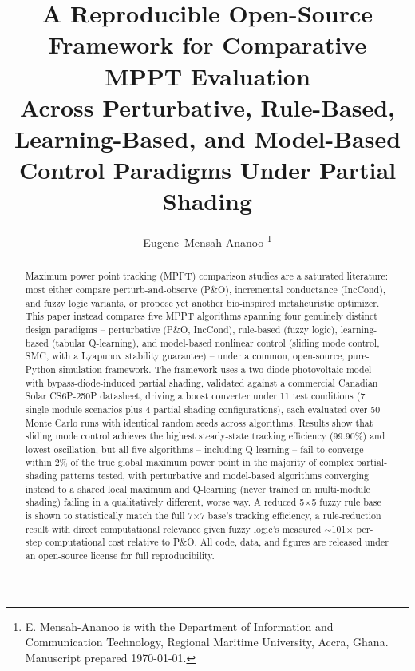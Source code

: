 \documentclass[journal]{IEEEtran}
\begin{document}
\title{A Reproducible Open-Source Framework for Comparative MPPT Evaluation\\
Across Perturbative, Rule-Based, Learning-Based, and Model-Based\\
Control Paradigms Under Partial Shading}


\author{Eugene~Mensah-Ananoo%
  \thanks{E. Mensah-Ananoo is with the Department of Information and
  Communication Technology, Regional Maritime University, Accra, Ghana.
  Manuscript prepared \today.}}


\maketitle

\begin{abstract}
Maximum power point tracking (MPPT) comparison studies are a saturated
literature: most either compare perturb-and-observe (P\&O), incremental
conductance (IncCond), and fuzzy logic variants, or propose yet another
bio-inspired metaheuristic optimizer. This paper instead compares five MPPT
algorithms spanning four genuinely distinct design paradigms --
perturbative (P\&O, IncCond), rule-based (fuzzy logic), learning-based
(tabular Q-learning), and model-based nonlinear control (sliding mode
control, SMC, with a Lyapunov stability guarantee) -- under a common,
open-source, pure-Python simulation framework. The framework uses a
two-diode photovoltaic model with bypass-diode-induced partial shading,
validated against a commercial Canadian Solar CS6P-250P datasheet, driving
a boost converter under 11 test conditions (7 single-module scenarios plus
4 partial-shading configurations), each evaluated over 50 Monte Carlo
runs with identical random seeds across algorithms. Results show that
sliding mode control achieves the highest steady-state tracking efficiency
(99.90\%) and lowest oscillation, but all five algorithms -- including
Q-learning -- fail to converge within 2\% of the true global maximum power
point in the majority of complex partial-shading patterns tested, with
perturbative and model-based algorithms converging instead to a shared
local maximum and Q-learning (never trained on multi-module shading)
failing in a qualitatively different, worse way. A reduced 5$\times$5 fuzzy
rule base is shown to statistically match the full 7$\times$7 base's
tracking efficiency, a rule-reduction result with direct computational
relevance given fuzzy logic's measured $\sim$101$\times$ per-step
computational cost relative to P\&O. All code, data, and figures are
released under an open-source license for full reproducibility.
\end{abstract}
\end{document}
